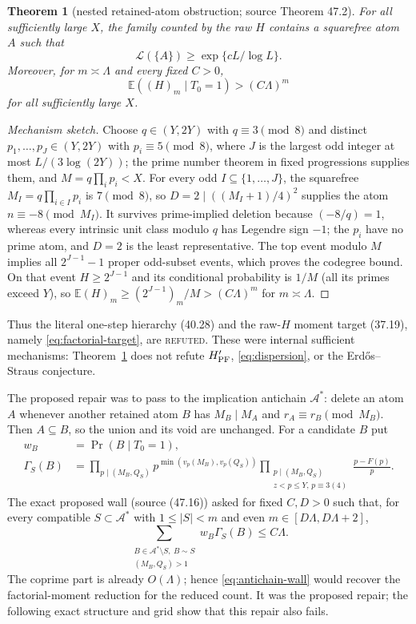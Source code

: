 \documentclass[10pt,reqno]{amsart}
\newtheorem{theorem}{Theorem}[section]
\theoremstyle{definition}
\newcommand{\1}{\mathbf 1}
\begin{document}
\begin{theorem}[nested retained-atom obstruction; source Theorem 47.2]
\label{thm:nested-cube}
For all sufficiently large $X$, the family counted by the raw $H$ contains
a squarefree atom $A$ such that
\[
 \mathcal L(\{A\})\geq\exp\{cL/\log L\}.
\]
Moreover, for $m\asymp\Lambda$ and every fixed $C>0$,
\[
 \mathbb E((H)_m\mid T_0=1)>(C\Lambda)^m
\]
for all sufficiently large $X$.
\end{theorem}
\begin{proof}[Mechanism sketch]
Choose $q\in(Y,2Y)$ with $q\equiv3\pmod8$ and distinct
$p_1,\ldots,p_J\in(Y,2Y)$ with $p_i\equiv5\pmod8$, where $J$ is the
largest odd integer at most $L/(3\log(2Y))$; the prime number theorem in
fixed progressions supplies them, and $M=q\prod_ip_i<X$.  For every odd
$I\subseteq\{1,\ldots,J\}$, the squarefree $M_I=q\prod_{i\in I}p_i$ is
$7\pmod8$, so $D=2\mid((M_I+1)/4)^2$ supplies the atom
$n\equiv-8\pmod {M_I}$.  It survives prime-implied deletion because
$(-8/q)=1$, whereas every intrinsic unit class modulo $q$ has Legendre sign
$-1$; the $p_i$ have no prime atom, and $D=2$ is the least representative.
The top event modulo $M$ implies all $2^{J-1}-1$ proper odd-subset events,
which proves the codegree bound.  On that event $H\geq2^{J-1}$ and its
conditional probability is $1/M$ (all its primes exceed $Y$), so
$\mathbb E(H)_m\geq(2^{J-1})_m/M>(C\Lambda)^m$ for
$m\asymp\Lambda$.
\end{proof}
Thus the literal one-step hierarchy (40.28) and the raw-$H$ moment target
(37.19), namely \eqref{eq:factorial-target}, are \textsc{refuted}.  These
were internal sufficient mechanisms: Theorem~\ref{thm:nested-cube} does
not refute $H_{\rm PF}'$, \eqref{eq:dispersion}, or the Erd\H{o}s--Straus
conjecture.

The proposed repair was to pass to the implication antichain $\mathcal A^*$: delete
an atom $A$ whenever another retained atom $B$ has
$M_B\mid M_A$ and $r_A\equiv r_B\pmod {M_B}$.  Then $A\subseteq B$, so
the union and its void are unchanged.  For a candidate $B$ put
\[
 \begin{aligned}
 w_B&=\Pr(B\mid T_0=1),\\
 \Gamma_S(B)&=\prod_{p\mid(M_B,Q_S)}p^{\min(v_p(M_B),v_p(Q_S))}
 \prod_{\substack{p\mid(M_B,Q_S)\\z<p\leq Y,\,p\equiv3(4)}}
       \frac{p-F(p)}p.
 \end{aligned}
\]
The exact proposed wall (source (47.16)) asked for fixed $C,D>0$ such that,
for every compatible $S\subset\mathcal A^*$ with $1\leq|S|<m$ and even
$m\in[D\Lambda,D\Lambda+2]$,
\begin{equation}\tag{47.16}\label{eq:antichain-wall}
 \sum_{\substack{B\in\mathcal A^*\setminus S,\ B\sim S\\
                   (M_B,Q_S)>1}}
       w_B\Gamma_S(B)\leq C\Lambda.
\end{equation}
The coprime part is already $O(\Lambda)$; hence
\eqref{eq:antichain-wall} would recover the factorial-moment reduction for
the reduced count.  It was the proposed repair; the following exact
structure and grid show that this repair also fails.
\end{document}
